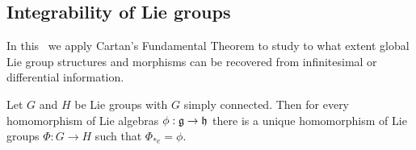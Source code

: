 \subsection{Integrability of Lie groups}\label{sec: existence of homs}


In this \subsect\ we apply Cartan's Fundamental Theorem to study to what extent global Lie group structures and morphisms can be recovered from infinitesimal or differential information.


\begin{thm}\label{thm second principle}
    Let $G$ and $H$ be Lie groups with $G$ simply connected. Then for every homomorphism of Lie algebras $\phi:\mathfrak{g}\to\mathfrak{h}$ there is a unique homomorphism of Lie groups $\Phi:G\to H$ such that $\Phi_{\ast e}=\phi$.
\end{thm}
